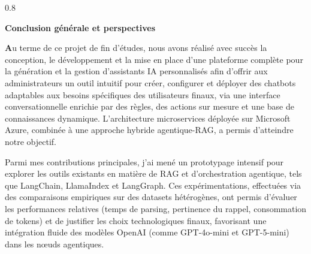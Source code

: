 \newpage
{}
{}
\begin{spacing}{0.8}
\end{spacing}
\begin{center}
    \LARGE \bfseries Conclusion générale et perspectives 
\end{center}
\vspace{30pt}
\adjustmtc
\thispagestyle{MyStyle}
{\fontsize{24}{24}\selectfont\textbf{A}}u terme de ce projet de fin d'études, nous avons réalisé avec succès la conception, le développement et la mise en place d'une plateforme complète pour la génération et la gestion d'assistants IA personnalisés afin d'offrir aux administrateurs un outil intuitif pour créer, configurer et déployer des chatbots adaptables aux besoins spécifiques des utilisateurs finaux, via une interface conversationnelle enrichie par des règles, des actions sur mesure et une base de connaissances dynamique. L'architecture microservices déployée sur Microsoft Azure, combinée à une approche hybride agentique-RAG, a permis d'atteindre notre objectif. \par
Parmi mes contributions principales, j'ai mené un prototypage intensif pour explorer les outils existants en matière de RAG et d'orchestration agentique, tels que LangChain, LlamaIndex et LangGraph. Ces expérimentations, effectuées via des comparaisons empiriques sur des datasets hétérogènes, ont permis d'évaluer les performances relatives (temps de parsing, pertinence du rappel, consommation de tokens) et de justifier les choix technologiques finaux, favorisant une intégration fluide des modèles OpenAI (comme GPT-4o-mini et GPT-5-mini) dans les nœuds agentiques. \par
